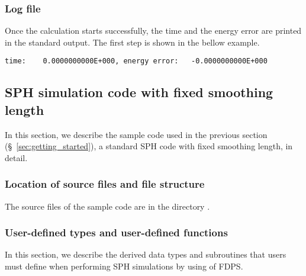 \subsubsection{Log file}
Once the calculation starts successfully, the time and the energy error are printed in the standard output. The first step is shown in the bellow example.
\begin{lstlisting}[caption=standard output]
time:    0.0000000000E+000, energy error:   -0.0000000000E+000
\end{lstlisting}

\subsection{SPH simulation code with fixed smoothing length}
\label{subsec:how_to_use_SPH_code}
In this section, we describe the sample code used in the previous section (\S~\ref{sec:getting_started}), a standard SPH code with fixed smoothing length, in detail.

\subsubsection{Location of source files and file structure}
The source files of the sample code are in the directory \dirNameSPHSample.

\subsubsection{User-defined types and user-defined functions}
In this section, we describe the derived data types and subroutines that users must define when performing SPH simulations by using of FDPS.

